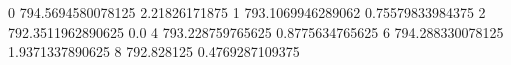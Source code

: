 0 794.5694580078125 2.21826171875
1 793.1069946289062 0.75579833984375
2 792.3511962890625 0.0
4 793.228759765625 0.8775634765625
6 794.288330078125 1.9371337890625
8 792.828125 0.4769287109375
